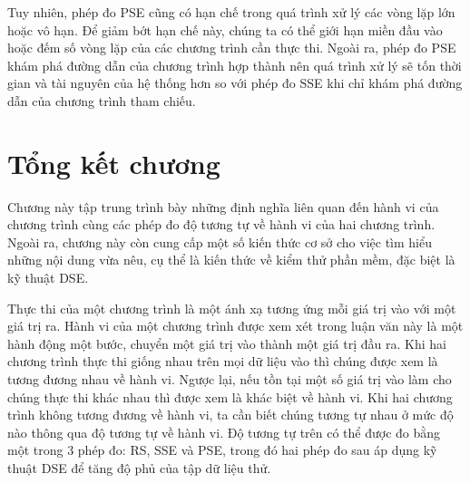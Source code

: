  Tuy nhiên, phép đo PSE cũng có hạn chế trong quá trình xử lý các 
 vòng lặp lớn hoặc vô hạn. Để giảm bớt hạn chế này, chúng ta có thể 
 giới hạn miền đầu vào hoặc đếm số vòng lặp của các chương trình 
 cần thực thi. Ngoài ra, phép đo PSE khám phá đường dẫn của chương 
 trình hợp thành nên quá trình xử lý sẽ tốn thời gian và tài nguyên 
 của hệ thống hơn so với phép đo SSE khi chỉ khám phá đường dẫn của 
 chương trình tham chiếu.

 \section*{Tổng kết chương}
 
 Chương này tập trung trình bày những định nghĩa liên quan đến hành vi
 của chương trình cùng các phép đo độ tương tự về hành vi của hai
 chương trình. Ngoài ra, chương này còn cung cấp một số kiến thức cơ
 sở cho việc tìm hiểu những nội dung vừa nêu, cụ thể là kiến thức về
 kiểm thử phần mềm, đặc biệt là kỹ thuật DSE.
 
Thực thi của một chương trình là một ánh xạ tương ứng mỗi giá trị vào
với một giá trị ra. Hành vi của một chương trình được xem xét trong
luận văn này là một hành động một bước, chuyển một giá trị vào thành
một giá trị đầu ra. Khi hai chương trình thực thi giống nhau trên mọi
dữ liệu vào thì chúng được xem là tương đương nhau về hành vi. Ngược
lại, nếu tồn tại một số giá trị vào làm cho chúng thực thi khác nhau
thì được xem là khác biệt về hành vi. Khi hai chương trình không tương
đương về hành vi, ta cần biết chúng tương tự nhau ở mức độ nào thông
qua độ tương tự về hành vi. Độ tương tự trên có thể được đo bằng một
trong $3$ phép đo: RS, SSE và PSE, trong đó hai phép đo sau áp dụng kỹ
thuật DSE để tăng độ phủ của tập dữ liệu thử.

  
